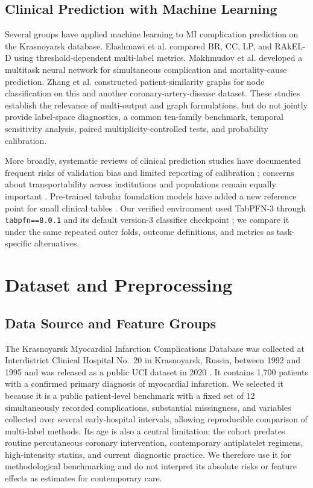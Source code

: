 \documentclass{ieeeaccess}
\begin{document}
\subsection{Clinical Prediction with Machine Learning}

Several groups have applied machine learning to MI complication prediction on the Krasnoyarsk database. Elashmawi et al. \cite{elashmawi2024} compared BR, CC, LP, and RAkEL-D using threshold-dependent multi-label metrics. Makhmudov et al. \cite{makhmudov2025} developed a multitask neural network for simultaneous complication and mortality-cause prediction. Zhang et al. \cite{jia2025} constructed patient-similarity graphs for node classification on this and another coronary-artery-disease dataset. These studies establish the relevance of multi-output and graph formulations, but do not jointly provide label-space diagnostics, a common ten-family benchmark, temporal sensitivity analysis, paired multiplicity-controlled tests, and probability calibration.

More broadly, systematic reviews of clinical prediction studies have documented frequent risks of validation bias and limited reporting of calibration \cite{christodoulou2019}; concerns about transportability across institutions and populations remain equally important \cite{futoma2020}. Pre-trained tabular foundation models have added a new reference point for small clinical tables \cite{hollmann2025}. Our verified environment used TabPFN-3 through \texttt{tabpfn==8.0.1} and its default version-3 classifier checkpoint \cite{tabpfn3report}; we compare it under the same repeated outer folds, outcome definitions, and metrics as task-specific alternatives.

\section{Dataset and Preprocessing}
\label{sec:dataset}

\subsection{Data Source and Feature Groups}

The Krasnoyarsk Myocardial Infarction Complications Database was collected at Interdistrict Clinical Hospital No.~20 in Krasnoyarsk, Russia, between 1992 and 1995 and was released as a public UCI dataset in 2020 \cite{uci2020}. It contains 1,700 patients with a confirmed primary diagnosis of myocardial infarction. We selected it because it is a public patient-level benchmark with a fixed set of 12 simultaneously recorded complications, substantial missingness, and variables collected over several early-hospital intervals, allowing reproducible comparison of multi-label methods. Its age is also a central limitation: the cohort predates routine percutaneous coronary intervention, contemporary antiplatelet regimens, high-intensity statins, and current diagnostic practice. We therefore use it for methodological benchmarking and do not interpret its absolute risks or feature effects as estimates for contemporary care.
\end{document}
